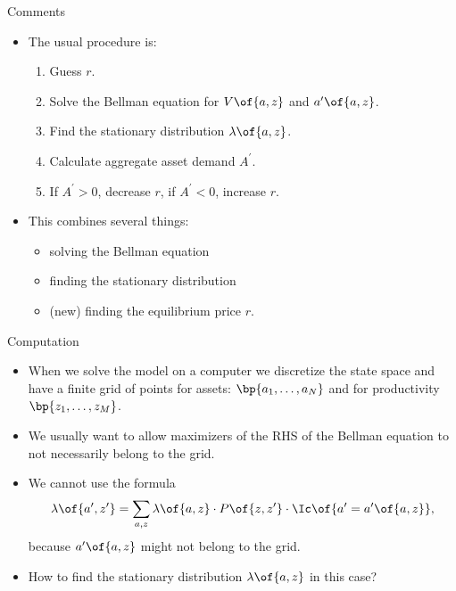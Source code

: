 \documentclass[11pt,xcolor={dvipsnames},aspectratio=159,hyperref={pdftex,pdfpagemode=UseNone,hidelinks,pdfdisplaydoctitle=true},usepdftitle=false]{beamer}
\begin{document}
\begin{frame}{Comments}   
        \begin{itemize}
            \item The usual procedure is: 
            \begin{enumerate}
            \item Guess $r$.
            \item Solve the Bellman equation for $V\of{a,z}$ and $a^\prime\of{a,z}$.
            \item Find the stationary distribution $\lambda\of{a,z}$.
            \item Calculate aggregate asset demand $A^\prime$.
            \item If $A^\prime>0$, decrease $r$, if $A^\prime<0$, increase $r$.
            \end{enumerate}
            \item This combines several things: 
            \begin{itemize}
            \item solving the Bellman equation
            \item finding the stationary distribution
            \item (new) finding the equilibrium price $r$.
            \end{itemize}
        \end{itemize}
        \end{frame}


\begin{frame}{Computation}   
    \begin{itemize}
        \item When we solve the model on a computer we discretize the state space and have a finite grid of points for assets: $\bp{a_1,\dots,a_N}$ and for productivity $\bp{z_1,\dots,z_M}$.
        \item We usually want to allow maximizers of the RHS of the Bellman equation to not necessarily belong to the grid.
        \item We cannot use the formula \begin{align*}
            \lambda\of{a^\prime,z^\prime} = \sum_{a,z} \lambda\of{a,z} \cdot P\of{z,z^\prime} \cdot \Ic\of{a^\prime = a^\prime\of{a,z}} , \end{align*}
            because $a^\prime\of{a,z}$ might not belong to the grid.
            \item How to find the stationary distribution $\lambda\of{a,z}$ in this case?
        \end{itemize}
    \end{frame}
\end{document}
